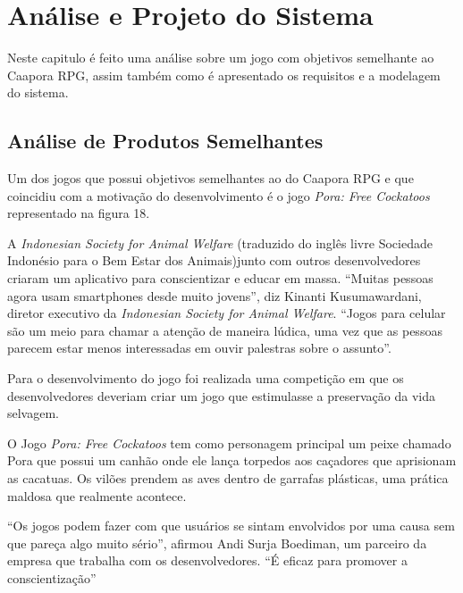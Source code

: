 \chapter{Análise e Projeto do Sistema}
\label{chap:Analise-e-levantamento-de-requisitos}

Neste capitulo é feito uma análise sobre um jogo com objetivos semelhante ao Caapora RPG, assim também como é apresentado os requisitos e a modelagem do sistema.

\section{Análise de Produtos Semelhantes}
\label{sec:analise-de-produtos-semelhantes}

Um dos jogos que possui objetivos semelhantes ao do Caapora RPG e que coincidiu com a motivação do desenvolvimento é o jogo \textit{Pora: Free Cockatoos} representado na figura 18.

A \textit{Indonesian Society for Animal Welfare} (traduzido do inglês livre Sociedade Indonésio para o Bem Estar dos Animais)junto com outros desenvolvedores
criaram um aplicativo para conscientizar e educar em massa. “Muitas pessoas agora usam smartphones desde muito jovens”, diz Kinanti Kusumawardani, diretor executivo da \textit{Indonesian Society for Animal Welfare}. “Jogos para celular são um meio para chamar a atenção de maneira lúdica, uma vez que as pessoas parecem estar menos interessadas em ouvir palestras sobre o assunto”.

Para o desenvolvimento do jogo foi realizada uma competição em que os desenvolvedores deveriam criar um jogo que estimulasse a preservação da vida selvagem.

O Jogo \textit{Pora: Free Cockatoos} tem como personagem principal um peixe chamado Pora que possui um canhão onde ele lança torpedos aos caçadores que aprisionam as cacatuas.
Os vilões prendem as aves dentro de garrafas plásticas, uma prática maldosa que realmente acontece.

“Os jogos podem fazer com que usuários se sintam envolvidos por uma causa sem que pareça algo muito sério”, afirmou Andi Surja Boediman, um parceiro da empresa que trabalha com os desenvolvedores. “É eficaz para promover a conscientização” \cite{anda}

\begin{figure}[h!]
		\centering
	\end{figure}
\pagebreak
